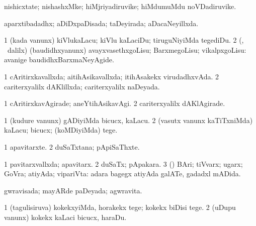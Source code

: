 {\bentry
{} 
\gl{\nA}
\expl{}
\bmng
nishicxtate; nishashxMke; hiMjriyadiruvike; hiMdumuMdu noVDadiruvike. 
\emng
\eentry

\bentry
{} 
\gl{\gu}
\expl{}
\bmng
aparxtibadadhx; aDiDxpaDisada; taDeyirada; aDacaNeyillxda. 
\emng
\eentry

\bentry
{} 
\gl{\sakirx}
\expl{}
\bmng
\bnum
\num{1} (kada \mo vanunx) kiVlukaLacu; kiVlu kaLaciDu; tiruguNiyiMda tegediDu. 
\num{2} (\rUpa, \kanmu\ \BUkaq dalilx) (baudidhxyanunx) avayxvasethxgoLisu; BarxmegoLisu; vikalpxgoLisu:  avanige baudidhxBarxmaNeyAgide. 
\enum
\emng
\eentry

\bentry
{} 
\gl{\gu}
\expl{}
\bmng
{} 
\emng
\eentry

\bentry
{} 
\gl{\gu}
\expl{}
\bmng
\bnum
\num{1} cAritirxkavallxda; aitihAsikavallxda; itihAsakekx virudadhxvAda. 
\num{2} cariterxyalilx dAKlillxda; cariterxyalilx naDeyada. 
\enum
\emng
\eentry

\bentry
{} 
\gl{\kirxvi}
\expl{}
\bmng
\bnum
\num{1} cAritirxkavAgirade; aneYtihAsikavAgi. 
\num{2} cariterxyalilx dAKlAgirade. 
\enum
\emng
\eentry

\bentry
{} 
\gl{\akirx}
\expl{}
\bmng
\bnum
\num{1} (kudure \mo vanunx) gADiyiMda bicucx, kaLacu. 
\num{2} (vasutx \mo vanunx kaTiTxniMda) kaLacu; bicucx; (koMDiyiMda) tege. 
\enum
\emng
\eentry

\bentry
{} 
\gl{\nA}
\expl{}
\bmng
\bnum
\num{1} apavitarxte. 
\num{2} duSaTxtana; pApiSaThxte. 
\enum
\emng
\eentry

\bentry
{} 
\gl{\gu}
\bmng
\bnum
\num{1} pavitarxvallxda; apavitarx. 
\num{2} duSaTx; pApakara. 
\num{3} (\AmA) BAri; tiVvarx; ugarx; GoVra; atiyAda; vipariVta:  adara bagegx atiyAda galATe, gadadxl mADida. 
\enum
\emng
\eentry

\bentry
{} 
\gl{\gu}
\expl{}
\bmng
gwravisada; mayARde paDeyada; agwravita. 
\emng
\eentry

\bentry
{} 
\gl{\sakirx}
\expl{}
\bmng
\bnum
\num{1} (tagulisiruva) kokekxyiMda, horakekx tege; kokekx biDisi tege. 
\num{2} (uDupu \mo vanunx) kokekx kaLaci bicucx, haraDu. 
\enum
\emng
\eentry

}
